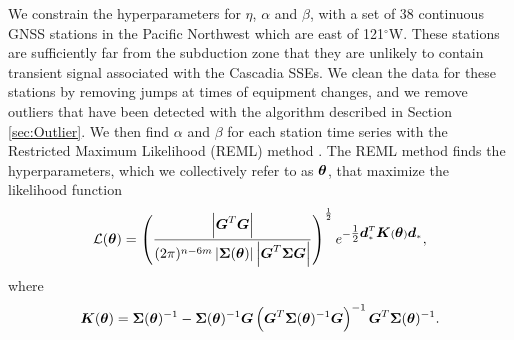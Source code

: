\documentclass[extra,mreferee]{gji}
\begin{document}
We constrain the hyperparameters for $\eta$, $\alpha$ and $\beta$, with a set of 38 continuous GNSS stations in the Pacific Northwest which are east of 121$^\circ$W.  These stations are sufficiently far from the subduction zone that they are unlikely to contain transient signal associated with the Cascadia SSEs.  We clean the data for these stations by removing jumps at times of equipment changes, and we remove outliers that have been detected with the algorithm described in Section \ref{sec:Outlier}. We then find $\alpha$ and $\beta$ for each station time series with the Restricted Maximum Likelihood (REML) method \cite[e.g.,][]{Harville1974,Cressie1992,Hines2017}. The REML method finds the hyperparameters, which we collectively refer to as $\mitbf{\theta}$, that maximize the likelihood function
\begin{equation}\label{eq:REML}
\mathcal{L}(\mitbf{\theta}) = \left(\frac{\left|\mitbf{G}^T\mitbf{G}\right|}
                           {(2\pi)^{n-6m} 
                           \left| \mitbf{\Sigma}(\mitbf{\theta}) \right| 
                           \left| \mitbf{G}^T\mitbf{\Sigma}\mitbf{G} \right|}\right)^{\frac{1}{2}} 
                           e^{-\tfrac{1}{2}\mitbf{d}_*^T\mitbf{K}(\mitbf{\theta})\mitbf{d}_*},
\end{equation}
where
\begin{equation}
\mitbf{K}(\mitbf{\theta}) = \mitbf{\Sigma}(\mitbf{\theta})^{-1} - 
                      \mitbf{\Sigma}(\mitbf{\theta})^{-1}\mitbf{G}
         \left(\mitbf{G}^T\mitbf{\Sigma}(\mitbf{\theta})^{-1}\mitbf{G}\right)^{-1}
         \mitbf{G}^T\mitbf{\Sigma}(\mitbf{\theta})^{-1}.
\end{equation}
\end{document}
